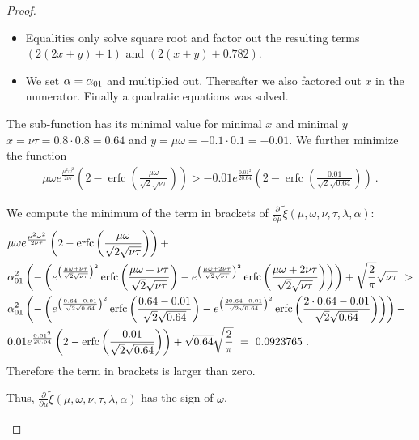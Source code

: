 \documentclass{article}
\newcommand\xinn{{\tilde \xi}}
\DeclareMathOperator{\erfc}{erfc}
\begin{document}
\begin{proof}
\begin{itemize}
\begin{itemize}
\item Equalities only solve square root and factor out the resulting
  terms $(2(2 x+y)+1)$ and $(2(x+y)+0.782)$.

\item We set $\alpha=\alpha_{\rm 01}$ and multiplied out. Thereafter we
  also factored out $x$ in the numerator. Finally a quadratic
  equations was solved. 
\end{itemize}

The sub-function has its minimal value for 
minimal $x$ and minimal $y$
$x=\nu\tau=0.8 \cdot 0.8=0.64$ and $y=\mu \omega=-0.1 \cdot 0.1=-0.01$. 
We further minimize the function
\begin{align}
\mu \omega e^{\frac{\mu^2 \omega^2}{2 \nu \tau}}
  \left(2-\erfc \left(\frac{\mu \omega}{\sqrt{2} \sqrt{\nu
  \tau}}\right)\right)>-0.01 e^{\frac{0.01^2}{2 0.64}}
  \left(2-\erfc \left(\frac{0.01}{\sqrt{2}
  \sqrt{0.64}}\right)\right) \ .
\end{align}


We compute the minimum of the term in brackets of $\frac{\partial }{\partial \mu } \xinn(\mu,\omega,\nu,\tau,\lambda ,\alpha )$:  
\begin{align}
&\mu \omega e^{\frac{\mu^2 \omega^2}{2 \nu \tau}}
  \left(2-\erfc \left(\frac{\mu \omega}{\sqrt{2} \sqrt{\nu \tau}}\right)\right)+ \\ \nonumber
&\alpha_{\rm 01}^2 \left(-\left(e^{\left(\frac{\mu \omega+\nu \tau}{\sqrt{2} \sqrt{\nu \tau}}\right)^2} 
\erfc \left(\frac{\mu \omega+\nu \tau}{\sqrt{2} \sqrt{\nu \tau}}\right)-e^{\left(\frac{\mu \omega+2 \nu \tau}{\sqrt{2} 
\sqrt{\nu \tau}}\right)^2} \erfc \left(\frac{\mu \omega+2 \nu \tau}{\sqrt{2} \sqrt{\nu \tau}}\right)\right)\right)+ \sqrt{\frac{2}{\pi }} \sqrt{\nu \tau} \ > \\ \nonumber
&\alpha_{\rm 01}^2 \left(-\left(e^{\left(\frac{0.64 -0.01}{\sqrt{2} \sqrt{0.64}}\right)^2} 
\erfc \left(\frac{0.64 -0.01}{\sqrt{2} \sqrt{0.64}}\right)-e^{\left(\frac{2 0.64-0.01}{\sqrt{2} \sqrt{0.64}}\right)^2}
\erfc \left(\frac{2 \cdot 0.64-0.01}{\sqrt{2} \sqrt{0.64}}\right)\right)\right)-\\ \nonumber 
&0.01 e^{\frac{0.01^2}{2 0.64}} \left(2-\erfc \left(\frac{0.01}{\sqrt{2} \sqrt{0.64}}\right)\right)+\sqrt{0.64} \sqrt{\frac{2}{\pi }} \ = \ 0.0923765 \ .
\end{align}
Therefore the term in brackets is larger than zero.

Thus, $\frac{\partial }{\partial \mu }
\xinn(\mu,\omega,\nu,\tau,\lambda ,\alpha )$
has the sign of $\omega$.



\end{itemize}
\end{proof}
\end{document}
